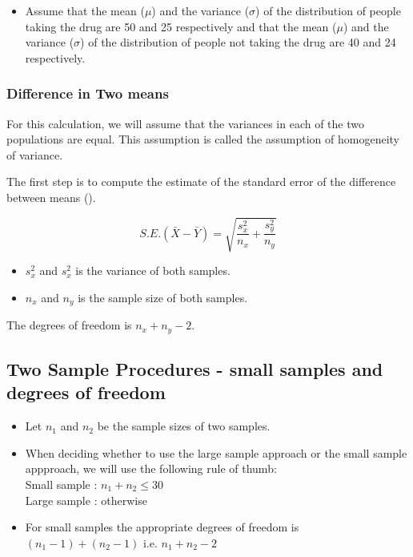 \documentclass[]{report}
\begin{document}
\begin{itemize}
\item Assume that the mean ($\mu$) and the variance ($\sigma$) of the distribution
of people taking the drug are 50 and 25 respectively and that the mean ($\mu$)
and the variance ($\sigma$) of the distribution of people not taking the drug are
40 and 24 respectively.
\end{itemize}







\subsubsection{Difference in Two means}
For this calculation, we will assume that the variances in each of the two populations are equal. This assumption is called the assumption of homogeneity of variance.

The first step is to compute the estimate of the standard error of the difference between means ().

\[ S.E.(\bar{X}-\bar{Y}) = \sqrt{\frac{s^2_x}{n_x} + \frac{s^2_y}{n_y}} \]

\begin{itemize}
\item $s^2_x$ and $s^2_x$ is the variance of both samples.
\item $n_x$ and $n_y$ is the sample size of both samples.
\end{itemize}
The degrees of freedom is $n_x + n_y -2$.




\subsection*{Two Sample Procedures - small samples and degrees of freedom}
\begin{itemize}
\item Let $n_1$ and $n_2$ be the sample sizes of two samples.
\item When deciding whether to use the large sample approach or the small sample appproach, we will use the following rule of thumb: \\
Small sample : $n_1+n_2 \leq 30$\\
Large sample : otherwise\\
\item For small samples the appropriate degrees of freedom is $(n_1-1) + (n_2-1)$ i.e. $n_1 + n_2-2$ 
\end{itemize}
\end{document}
